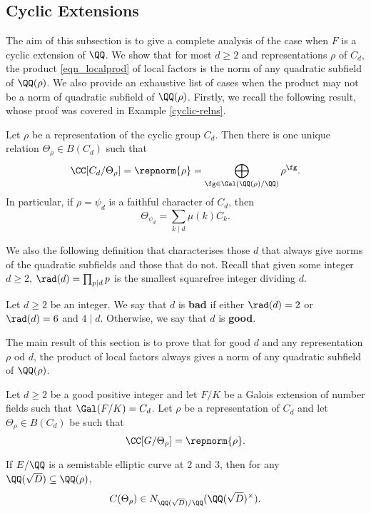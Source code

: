 \subsection{Cyclic Extensions}

The aim of this subsection is to give a complete analysis of the case when $F$ is a cyclic extension of $\QQ$. We show that for most $d\geq 2$ and representations $\rho$ of $C_d$, the product \eqref{eqn_localprod} of local factors is the norm of any quadratic subfield of $\QQ(\rho)$. We also provide an exhaustive list of cases when the product may not be a norm of quadratic subfield of $\QQ(\rho)$. Firstly, we recall the following result, whose proof was covered in Example \ref{cyclic-relns}.

\begin{lemma}\label{lem_relation}
    Let $\rho$ be a representation of the cyclic group $C_d$. Then there is one unique relation $\Theta_\rho\in B(C_d)$ such that 
    $$\CC[C_d/\Theta_{\rho}]=\repnorm{\rho}=\bigoplus_{\fg\in\Gal(\QQ(\rho)/\QQ)}\rho^{\fg}.$$
    In particular, if $\rho=\psi_d$ is a faithful character of $C_d$, then
    $$\Theta_{\psi_d}=\sum_{k\mid d}\mu(k)C_k.$$
\end{lemma}


We also the following definition that characterises those $d$ that always give norms of the quadratic subfields and those that do not. Recall that given some integer $d\geq 2$, $\rad(d)=\prod_{p\mid d}p$ is the smallest squarefree integer dividing $d$.

\begin{defn}
    Let $d\geq 2$ be an integer. We say that $d$ is \textbf{bad} if either $\rad(d)=2$ or $\rad(d)=6$ and $4\mid d$. Otherwise, we say that $d$ is \textbf{good}.
\end{defn}

The main result of this section is to prove that for good $d$ and any representation $\rho$ od $d$, the product of local factors always gives a norm of any quadratic subfield of $\QQ(\rho)$.

\begin{thm}\label{thm_consistent_cyclic}
    Let $d\geq2$ be a good positive integer and let $F/K$ be a Galois extension of number fields such that $\Gal(F/K)=C_d$. Let $\rho$ be a representation of $C_d$ and let $\Theta_\rho\in B(C_d)$ be such that
    $$\CC[G/\Theta_\rho]=\repnorm{\rho}.$$

    If $E/\QQ$ is a semistable elliptic curve at $2$ and $3$, then for any $\QQ(\sqrt{D})\subseteq\QQ(\rho)$,
    $$C(\Theta_\rho)\in N_{\QQ(\sqrt{D})/\QQ}(\QQ(\sqrt{D})^{\times}).$$
\end{thm}

